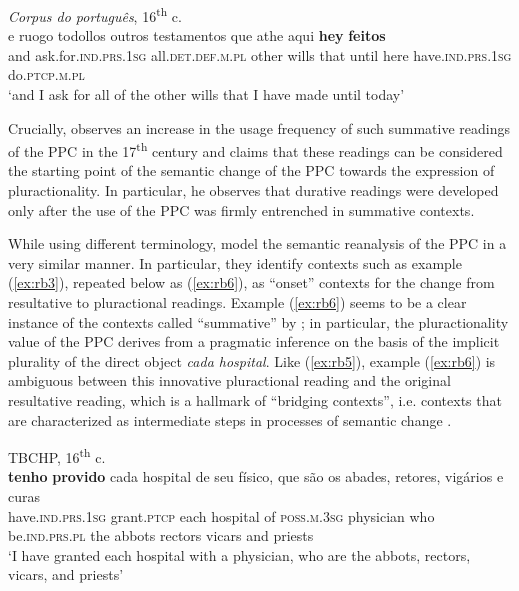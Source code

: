 \documentclass[output=paper,colorlinks,citecolor=brown]{langscibook}
\begin{document}
\ea\label{ex:rb5}
\textit{Corpus do português}, 16\textsuperscript{th} c. \citep[29]{Becker2017}\\
\gll e ruogo todollos outros testamentos que athe aqui \textbf{hey} \textbf{feitos}\\
and ask.for.\textsc{ind.prs.1sg} all.\textsc{det.def.m.pl} other wills that until here have.\textsc{ind.prs.1sg} do.\textsc{ptcp.m.pl}\\
\glt ‘and I ask for all of the other wills that I have made until today’
\z

Crucially, \citet[33]{Becker2017} observes an increase in the usage frequency of such summative readings of the PPC in the 17\textsuperscript{th} century and claims that these readings can be considered the starting point of the semantic change of the PPC towards the expression of pluractionality. In particular, he observes that durative readings were developed only after the use of the PPC was firmly entrenched in summative contexts. 

While using different terminology, \citet{AmaralHowe2012} model the semantic reanalysis of the PPC in a very similar manner. In particular, they identify contexts such as example (\ref{ex:rb3}), repeated below as (\ref{ex:rb6}), as “onset” contexts for the change from resultative to pluractional readings. Example (\ref{ex:rb6}) seems to be a clear instance of the contexts called “summative” by \citet{Becker2017}; in particular, the pluractionality value of the PPC derives from a pragmatic inference on the basis of the implicit plurality of the direct object \textit{cada hospital}. Like (\ref{ex:rb5}), example (\ref{ex:rb6}) is ambiguous between this innovative pluractional reading and the original resultative reading, which is a hallmark of “bridging contexts”, i.e. contexts that are characterized as intermediate steps in processes of semantic change \parencite{Heine2002}.

\ea\label{ex:rb6}
TBCHP, 16\textsuperscript{th} c.  \citep[43]{AmaralHowe2012}\\
\gll \textbf{tenho} \textbf{provido} cada hospital de seu físico, que são os abades, retores, vigários e curas\\
have.\textsc{ind.prs.1sg} grant.\textsc{ptcp} each hospital of \textsc{poss.m.3sg} physician who be.\textsc{ind.prs.pl} the abbots rectors vicars and priests\\
\glt ‘I have granted each hospital with a physician, who are the abbots, rectors, vicars, and priests’
\z
\end{document}
